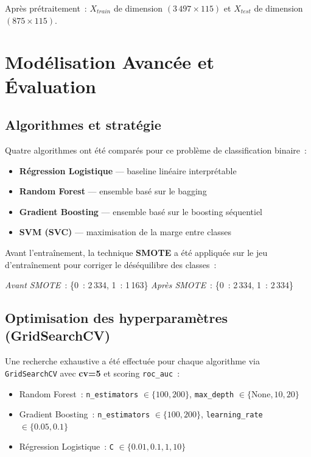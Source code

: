 \documentclass[12pt, a4paper]{article}
\newcommand{\code}[1]{\texttt{\small#1}}
\begin{document}
Après prétraitement~: $X_{train}$ de dimension $(3\,497 \times 115)$ et
$X_{test}$ de dimension $(875 \times 115)$.

\section{Modélisation Avancée et Évaluation}

\subsection{Algorithmes et stratégie}

Quatre algorithmes ont été comparés pour ce problème de classification binaire~:

\begin{itemize}
  \item \textbf{Régression Logistique} — baseline linéaire interprétable
  \item \textbf{Random Forest} — ensemble basé sur le bagging
  \item \textbf{Gradient Boosting} — ensemble basé sur le boosting séquentiel
  \item \textbf{SVM (SVC)} — maximisation de la marge entre classes
\end{itemize}

Avant l'entraînement, la technique \textbf{SMOTE} a été appliquée sur le jeu
d'entraînement pour corriger le déséquilibre des classes~:

\begin{center}
\textit{Avant SMOTE}~: \{0~: 2\,334, 1~: 1\,163\}
\hspace{1cm}
\textit{Après SMOTE}~: \{0~: 2\,334, 1~: 2\,334\}
\end{center}

\subsection{Optimisation des hyperparamètres (GridSearchCV)}

Une recherche exhaustive a été effectuée pour chaque algorithme via
\code{GridSearchCV} avec \textbf{cv=5} et scoring \code{roc\_auc}~:

\begin{itemize}
  \item Random Forest~: \code{n\_estimators} $\in \{100, 200\}$,
        \code{max\_depth} $\in \{\text{None}, 10, 20\}$
  \item Gradient Boosting~: \code{n\_estimators} $\in \{100, 200\}$,
        \code{learning\_rate} $\in \{0.05, 0.1\}$
  \item Régression Logistique~: \code{C} $\in \{0.01, 0.1, 1, 10\}$
\end{itemize}
\end{document}
